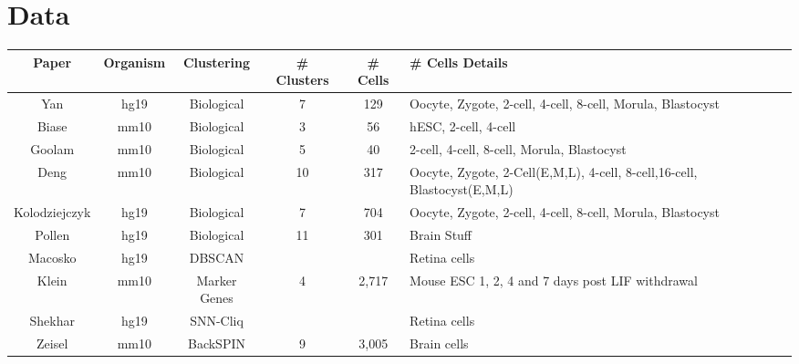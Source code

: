 \documentclass[11pt]{article}
\begin{document}
\section{Data}
\begin{tabular}{ | c | c | c | c | c | p{6cm} | }
\hline
\textbf{Paper} & \textbf{Organism} & \textbf{Clustering} & \textbf{\# Clusters}& \textbf{\# Cells }& \textbf{\# Cells} \textbf{Details}\\
\hline
Yan & 
hg19 & 
Biological & 
7 & 
129 & 
Oocyte, Zygote, 2-cell, 4-cell, 8-cell, Morula, Blastocyst\\
\hline
Biase & 
mm10 & 
Biological & 
3 & 
56 & 
hESC, 2-cell, 4-cell\\
\hline
Goolam & 
mm10 & 
Biological & 
5 & 
40 & 
2-cell, 4-cell, 8-cell, Morula, Blastocyst\\
\hline
Deng & 
mm10 & 
Biological & 
10 &  
317& 
Oocyte, Zygote, 2-Cell(E,M,L), 4-cell, 8-cell,16-cell, Blastocyst(E,M,L)\\
\hline
Kolodziejczyk & 
hg19 & 
Biological & 
7 &
704   
& 
Oocyte, Zygote, 2-cell, 4-cell, 8-cell, Morula, Blastocyst\\
\hline
Pollen & 
hg19 & 
Biological & 
11 &  
301 & 
Brain Stuff\\
\hline
\hline
Macosko & 
hg19 & 
DBSCAN &  
&  
& Retina cells\\
\hline
Klein & 
mm10 & 
Marker Genes & 
4 & 
2,717 & 
Mouse ESC 1, 2, 4 and 7 days post LIF withdrawal \\
\hline
Shekhar & 
hg19 & 
SNN-Cliq &  
&  
& Retina cells\\
\hline
Zeisel & 
mm10 & 
BackSPIN &  
9 & 
3,005 & 
Brain cells\\
\hline

\end{tabular}
\end{document}
